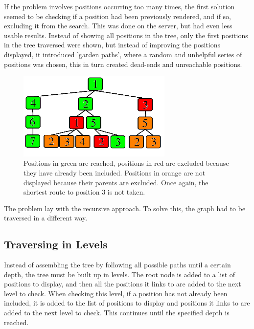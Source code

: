 If the problem involves positions occurring too many times, the first solution seemed to be checking if a position had been previously rendered, and if so, excluding it from the search. This was done on the server, but had even less usable results. Instead of showing all positions in the tree, only the first positions in the tree traversed were shown, but instead of improving the positions displayed, it introduced 'garden paths', where a random and unhelpful series of positions was chosen, this in turn created dead-ends and unreachable positions.

\begin{figure}[h]
\centering
\includegraphics[width=3in]{Images/3/tree-1-example-2}
\caption{Positions in green are reached, positions in red are excluded because they have already been included. Positions in orange are not displayed because their parents are excluded. Once again, the shortest route to position 3 is not taken.}
\label{3_recursive_exclude_wrong}
\end{figure}

The problem lay with the recursive approach. To solve this, the graph had to be traversed in a different way.

\subsection{Traversing in Levels}
Instead of assembling the tree by following all possible paths until a certain depth, the tree must be built up in levels. The root node is added to a list of positions to display, and then all the positions it links to are added to the next level to check. When checking this level, if a position has not already been included, it is added to the list of positions to display and positions it links to are added to the next level to check. This continues until the specified depth is reached.

